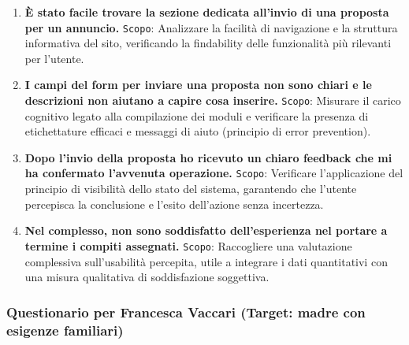 \begin{enumerate}
	\item \textbf{È stato facile trovare la sezione dedicata all’invio di una proposta per un annuncio.}
	\newline
	\texttt{Scopo}: Analizzare la facilità di navigazione e la struttura informativa del sito, verificando la findability delle funzionalità più rilevanti per l’utente.
	
	\item \textbf{I campi del form per inviare una proposta non sono chiari e le descrizioni non aiutano a capire cosa inserire.}
	\newline
	\texttt{Scopo}: Misurare il carico cognitivo legato alla compilazione dei moduli e verificare la presenza di etichettature efficaci e messaggi di aiuto (principio di error prevention).
	
	\item \textbf{Dopo l’invio della proposta ho ricevuto un chiaro feedback che mi ha confermato l’avvenuta operazione.}
	\newline
	\texttt{Scopo}: Verificare l’applicazione del principio di visibilità dello stato del sistema, garantendo che l’utente percepisca la conclusione e l’esito dell’azione senza incertezza.
	
	\item \textbf{Nel complesso, non sono soddisfatto dell’esperienza nel portare a termine i compiti assegnati.}
	\newline
	\texttt{Scopo}: Raccogliere una valutazione complessiva sull’usabilità percepita, utile a integrare i dati quantitativi con una misura qualitativa di soddisfazione soggettiva.
	
\end{enumerate}

\vspace{0.5cm} %
\subsubsection*{Questionario per Francesca Vaccari (Target: madre con esigenze familiari)}
\vspace{0.5cm} %

